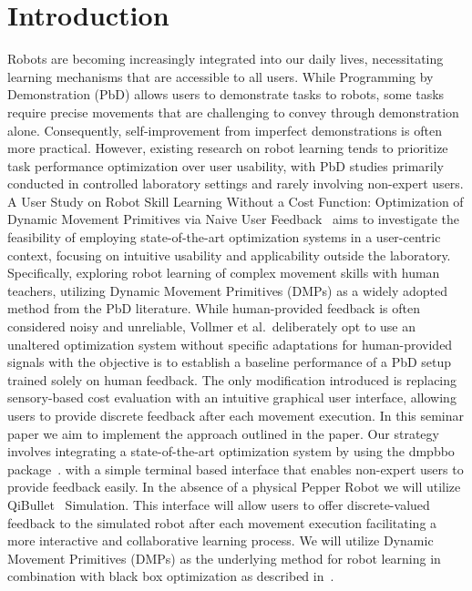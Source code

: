 \documentclass{article}
\begin{document}
    \section{Introduction}
    Robots are becoming increasingly integrated into our daily lives, necessitating learning mechanisms that are accessible to all users.
    While Programming by Demonstration (PbD) allows users to demonstrate tasks to robots, some tasks require precise movements
    that are challenging to convey through demonstration alone.
    Consequently, self-improvement from imperfect demonstrations is often more practical.
    However, existing research on robot learning tends to prioritize task performance optimization over user usability, with
    PbD studies primarily conducted in controlled laboratory settings and rarely involving non-expert users.
    \newline A User Study on Robot Skill Learning Without a Cost Function: Optimization of Dynamic Movement Primitives via Naive User
    Feedback~\cite{vollmer2018} aims to investigate the feasibility of employing state-of-the-art optimization systems in a
    user-centric context, focusing on intuitive usability and applicability outside the laboratory.
    Specifically, exploring robot learning of complex movement skills with human teachers, utilizing Dynamic Movement Primitives
    (DMPs) as a widely adopted method from the PbD literature.
    \newline While human-provided feedback is often considered noisy and unreliable, Vollmer et al.~deliberately opt to use an
    unaltered optimization system without specific adaptations for human-provided signals with the objective is to establish
    a baseline performance of a PbD setup trained solely on human feedback.
    The only modification introduced is replacing sensory-based cost evaluation with an intuitive graphical user interface,
    allowing users to provide discrete feedback after each movement execution.
    \newline In this seminar paper we aim to implement the approach outlined in the paper.
    Our strategy involves integrating a state-of-the-art optimization system by using the dmpbbo package~\cite{stulp2019dmpbbo}.
    with a simple terminal based interface that enables non-expert users to provide feedback easily.
    In the absence of a physical Pepper Robot we will utilize QiBullet~\cite{QiBullet} Simulation.
    This interface will allow users to offer discrete-valued feedback to the simulated robot after each movement execution
    facilitating a more interactive and collaborative learning process.
    We will utilize Dynamic Movement Primitives (DMPs) as the underlying method for robot learning in combination with
    black box optimization as described in~\cite{stulp2019dmpbbo}.
\end{document}
